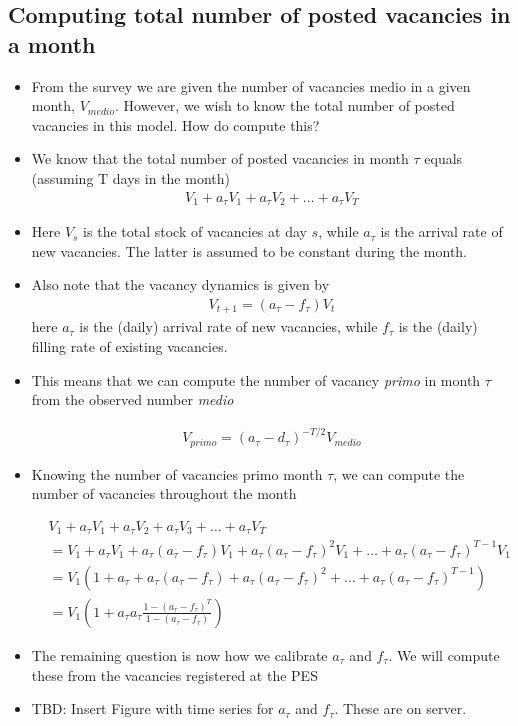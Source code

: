 \subsection{Computing total number of posted vacancies in a month}

\begin{itemize}

\item From the survey we are given the number of vacancies medio in a given month, $V_{medio}$. However, we wish to know the total number of posted vacancies in this model. How do compute this? 

\item We know that the total number of posted vacancies in month $\tau$ equals (assuming T days in the month)
\begin{align}
V_1+a_\tau V_1+a_\tau V_2+\dots+a_\tau V_{T}
\end{align}

\item Here $V_s$ is the total stock of vacancies at day $s$, while $a_\tau$ is the arrival rate of new vacancies. The latter is assumed to be constant during the month.

\item Also note that the vacancy dynamics is given by
\begin{align}
V_{t+1}=(a_\tau-f_\tau)V_t
\end{align}
here $a_\tau$ is the (daily) arrival rate of new vacancies, while $f_\tau$ is the (daily) filling rate of existing vacancies. 

\item This means that we can compute the number of vacancy \emph{primo} in month $\tau$ from the observed number \emph{medio}

\begin{align}
V_{primo}=(a_\tau-d_\tau)^{-T/2}V_{medio}
\end{align}

\item Knowing the number of vacancies primo month $\tau$, we can compute the number of vacancies throughout the month 

\begin{align}
&V_1+a_\tau V_1+a_\tau V_2+a_\tau V_3+\dots+a_\tau V_T \\
&=V_1+a_\tau V_1+a_\tau(a_\tau-f_\tau) V_1+a_\tau(a_\tau-f_\tau)^2 V_1+\dots+a_\tau (a_\tau-f_\tau)^{T-1} V_1 \\
&=V_1(1+a_\tau +a_\tau(a_\tau-f_\tau) +a_\tau(a_\tau-f_\tau)^2+\dots+a_\tau (a_\tau-f_\tau)^{T-1}) \\
&=V_1(1+a_\tau a_\tau \frac{1-(a_\tau-f_\tau)^T}{1-(a_\tau-f_\tau)}  )
\end{align}

\item The remaining question is now how we calibrate $a_\tau$ and $f_\tau$. We will compute these from the vacancies registered at the PES 

\item TBD: Insert Figure with time series for $a_\tau$ and $f_\tau$. These are on server.

\begin{figure}
[INSERT FIGURE]
\end{figure}

\end{itemize}
